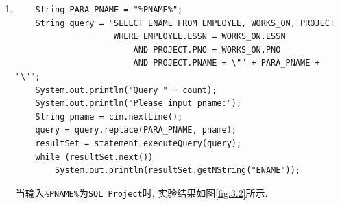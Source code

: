 \documentclass{ML}
\begin{document}
\begin{enumerate}
   \item \begin{verbatim}
    String PARA_PNAME = "%PNAME%";
    String query = "SELECT ENAME FROM EMPLOYEE, WORKS_ON, PROJECT 
                    WHERE EMPLOYEE.ESSN = WORKS_ON.ESSN 
                        AND PROJECT.PNO = WORKS_ON.PNO 
                        AND PROJECT.PNAME = \"" + PARA_PNAME + "\"";
    System.out.println("Query " + count);
    System.out.println("Please input pname:");
    String pname = cin.nextLine();
    query = query.replace(PARA_PNAME, pname);
    resultSet = statement.executeQuery(query);
    while (resultSet.next())
        System.out.println(resultSet.getNString("ENAME"));
    \end{verbatim}
    当输入\texttt{\%PNAME\%}为\texttt{SQL Project}时, 实验结果如图\ref{fig:3.2}所示.
    \begin{figure}[H]
        \centering

\end{figure}
\end{enumerate}
\end{document}

